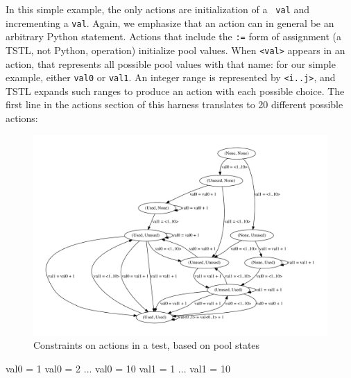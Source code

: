 In this simple example, the only actions are initialization of a {\tt
  val} and incrementing a {\tt val}.  Again, we emphasize that an
action can in general be an arbitrary Python statement.  Actions that
include the {\tt :=} form of assignment (a TSTL, not Python,
operation) initialize pool values.  When {\tt <val>} appears in an
action, that represents all possible pool values with that name: for
our simple example, either {\tt val0} or {\tt val1}.  An integer range
is represented by {\tt <i..j>}, and TSTL expands such ranges to
produce an action with each possible choice. The first line in the
actions section of this harness translates to 20 different possible
actions:

\begin{figure}
\includegraphics[width=\columnwidth]{states}
\caption{Constraints on actions in a test, based on pool states}
\label{fig:poolacts}
\end{figure}

{\scriptsize
\begin{code}
val0 = 1
val0 = 2 ...
val0 = 10
val1 = 1 ...
val1 = 10
\end{code}
}

